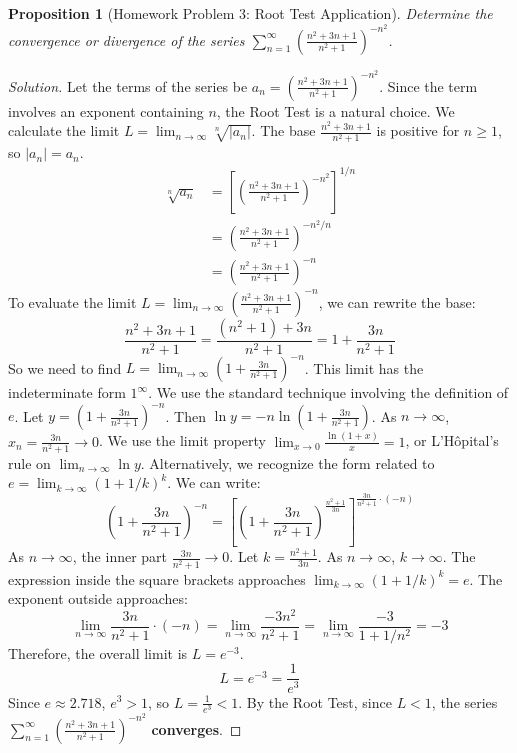 \documentclass[11pt, a4paper]{article}
\theoremstyle{plain} %
\newtheorem{proposition}[theorem]{Proposition}
\theoremstyle{definition} %
\begin{document}
\begin{proposition}[Homework Problem 3: Root Test Application]\label{prob:root_test_ex}
Determine the convergence or divergence of the series $\sum_{n=1}^{\infty} \left(\frac{n^2+3n+1}{n^2+1}\right)^{-n^2}$.
\end{proposition}
\begin{proof}[Solution]
Let the terms of the series be $a_n = \left(\frac{n^2+3n+1}{n^2+1}\right)^{-n^2}$.
Since the term involves an exponent containing $n$, the Root Test is a natural choice. We calculate the limit $L = \lim_{n\to\infty} \sqrt[n]{|a_n|}$.
The base $\frac{n^2+3n+1}{n^2+1}$ is positive for $n \ge 1$, so $|a_n|=a_n$.
\begin{align*}
\sqrt[n]{a_n} &= \left[ \left(\frac{n^2+3n+1}{n^2+1}\right)^{-n^2} \right]^{1/n} \\
&= \left(\frac{n^2+3n+1}{n^2+1}\right)^{-n^2/n} \\
&= \left(\frac{n^2+3n+1}{n^2+1}\right)^{-n}
\end{align*}
To evaluate the limit $L = \lim_{n\to\infty} \left(\frac{n^2+3n+1}{n^2+1}\right)^{-n}$, we can rewrite the base:
$$ \frac{n^2+3n+1}{n^2+1} = \frac{(n^2+1) + 3n}{n^2+1} = 1 + \frac{3n}{n^2+1} $$
So we need to find $L = \lim_{n\to\infty} \left(1 + \frac{3n}{n^2+1}\right)^{-n}$.
This limit has the indeterminate form $1^\infty$. We use the standard technique involving the definition of $e$. Let $y = (1 + \frac{3n}{n^2+1})^{-n}$. Then $\ln y = -n \ln(1 + \frac{3n}{n^2+1})$.
As $n \to \infty$, $x_n = \frac{3n}{n^2+1} \to 0$. We use the limit property $\lim_{x\to 0} \frac{\ln(1+x)}{x} = 1$, or L'Hôpital's rule on $\lim_{n\to\infty} \ln y$.
Alternatively, we recognize the form related to $e = \lim_{k\to\infty} (1+1/k)^k$.
We can write:
$$ \left(1 + \frac{3n}{n^2+1}\right)^{-n} = \left[ \left(1 + \frac{3n}{n^2+1}\right)^{\frac{n^2+1}{3n}} \right]^{\frac{3n}{n^2+1} \cdot (-n)} $$
As $n \to \infty$, the inner part $\frac{3n}{n^2+1} \to 0$. Let $k = \frac{n^2+1}{3n}$. As $n \to \infty$, $k \to \infty$.
The expression inside the square brackets approaches $\lim_{k\to\infty} (1 + 1/k)^k = e$.
The exponent outside approaches:
$$ \lim_{n\to\infty} \frac{3n}{n^2+1} \cdot (-n) = \lim_{n\to\infty} \frac{-3n^2}{n^2+1} = \lim_{n\to\infty} \frac{-3}{1+1/n^2} = -3 $$
Therefore, the overall limit is $L = e^{-3}$.
$$ L = e^{-3} = \frac{1}{e^3} $$
Since $e \approx 2.718$, $e^3 > 1$, so $L = \frac{1}{e^3} < 1$.
By the Root Test, since $L < 1$, the series $\sum_{n=1}^{\infty} \left(\frac{n^2+3n+1}{n^2+1}\right)^{-n^2}$ \textbf{converges}.
\end{proof}

\end{document}
